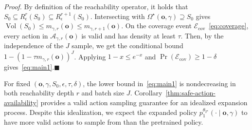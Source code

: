 \documentclass[letterpaper, 10 pt, conference]{ieeeconf}
\renewcommand{\o}{\mathbf{o}}
\begin{document}
\emph{Proof.} 
By definition of the reachability operator, it holds that
\(S_0\!\subseteq\!R_\epsilon^r(S_0)\!\subseteq\! R_\epsilon^{r+1}(S_0)\). Intersecting with $\Omega^\star(\o,\gamma)\supseteq S_0$ gives $\operatorname{Vol}(S_0)\le m_{\gamma,r}(\o)\le m_{\gamma,r+1}(\o)$. On the coverage event $\mathcal E_{\mathrm{cov}}$~\eqref{eq:coverage}, every action in $\mathcal A_{\gamma,r}(\o)$ is valid and has density at least $\tau$. Then, by the independence of the $J$ sample, we get the conditional bound \(1\!-\!\left(1\!-\!\tau m_{\gamma,r}(\o)\right)^J\). Applying \(1\!-\!x\!\le \!e^{-x}\) and $\Pr(\mathcal E_{\mathrm{cov}})\ge1-\delta$ gives~\eqref{eq:main1}.\hfill$\blacksquare$

For fixed $(\o,\gamma,S_0,\epsilon,\tau,\delta)$, the lower bound in~\eqref{eq:main1} is nondecreasing in both reachability depth $r$ and batch size $J$. Corollary~\ref{thm:safe-action-availability} provides a valid action sampling guarantee for an idealized expansion process. Despite this idealization, we expect the expanded policy $p_1^{\theta_{T^\star}}(\cdot\mid\o,\gamma)$ to have more valid actions to sample from than the pretrained policy.
\end{document}
